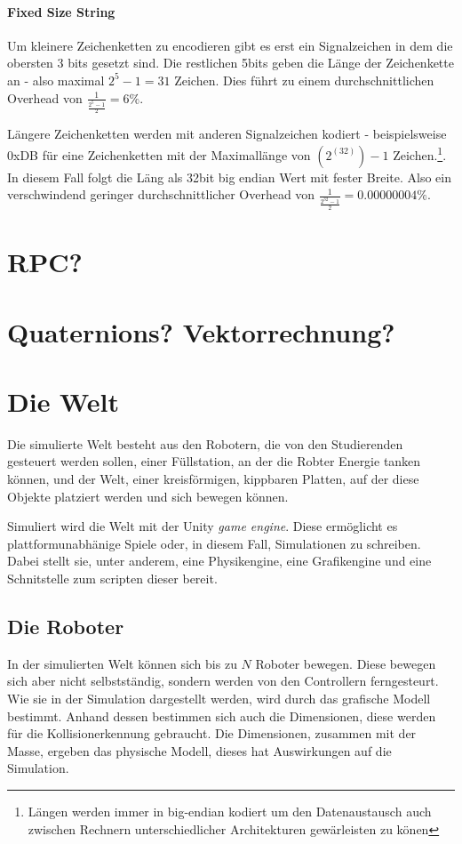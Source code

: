 \documentclass[
    12pt,
    bibliography=totoc,
    ngerman,
	enabledeprecatedfontcommands
]{scrartcl}
\begin{document}
\paragraph{Fixed Size String} Um kleinere Zeichenketten zu encodieren gibt es erst ein Signalzeichen  in dem die obersten 3 bits gesetzt sind. Die restlichen 5bits geben die L{\"{a}}nge der Zeichenkette an - also maximal $2^5 - 1 = 31$ Zeichen. Dies f{\"{u}}hrt zu einem durchschnittlichen Overhead von $ \frac{1}{\frac{2^5-1}{2}} = 6\% $.

L{\"{a}}ngere Zeichenketten
werden mit anderen Signalzeichen kodiert - beispielsweise 0xDB f{\"{u}}r eine Zeichenketten mit der Maximall{\"{a}}nge von $(2^(32))-1$ Zeichen.\footnote{L{\"{a}}ngen werden immer in big-endian kodiert um den Datenaustausch auch zwischen Rechnern unterschiedlicher Architekturen gew{\"{a}}rleisten zu k{\"{o}}nen}. In diesem Fall folgt die L{\"{a}}ng als 32bit big endian Wert mit fester Breite. Also ein verschwindend geringer durchschnittlicher Overhead von $ \frac{1}{\frac{2^32-1}{2}} = 0.00000004\% $.

\clearpage
\section{RPC?}

\clearpage
\section{Quaternions? Vektorrechnung?}

\clearpage
\section{Die Welt}
Die simulierte Welt besteht aus den Robotern, die von den Studierenden gesteuert werden sollen, einer F{\"{u}}llstation, an der die Robter Energie tanken k{\"{o}}nnen, und
der Welt, einer kreisf{\"{o}}rmigen, kippbaren Platten, auf der diese Objekte platziert werden und sich bewegen k{\"{o}}nnen.

Simuliert wird die Welt mit der Unity \textit{game engine}. Diese erm{\"{o}}glicht es plattformunabh{\"{a}}nige Spiele oder, in diesem Fall, Simulationen zu schreiben.
Dabei stellt sie, unter anderem, eine Physikengine, eine Grafikengine und eine Schnitstelle zum scripten dieser bereit. 

\subsection{Die Roboter}\label{robot}
In der simulierten Welt k{\"{o}}nnen sich bis zu $N$ Roboter bewegen. Diese bewegen sich aber nicht selbstst{\"{a}}ndig, sondern werden von den Controllern ferngesteurt.
Wie sie in der Simulation dargestellt werden, wird durch das grafische Modell bestimmt. Anhand dessen bestimmen sich auch die Dimensionen, diese werden f{\"{u}}r die Kollisionerkennung
gebraucht. Die Dimensionen, zusammen mit der Masse, ergeben das physische Modell, dieses hat Auswirkungen auf die Simulation.
\end{document}
